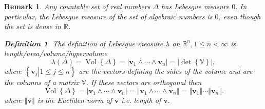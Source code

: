 \documentclass[aps,preprint]{revtex4}%
\newtheorem{definition}[theorem]{Definition}
\newtheorem{remark}[theorem]{Remark}
\begin{document}
\begin{remark}
Any \emph{countable }set of \emph{real} numbers $\Delta$ has \emph{Lebesgue}
measure $0.$ In particular, the Lebesgue measure of the set of algebraic
numbers is $0$, even though the set is dense in $\mathbb{R}$.

\begin{definition}
The definition of \emph{Lebesgue} measure $\lambda$ on $\mathbb{R}^{n},1\leq
n<\infty$ is \emph{length/area/volume/hypervolume}
\begin{equation}
\lambda\left(  \Delta\right)  =\operatorname*{Vol}\left\{  \Delta\right\}
=\left\vert \mathbf{v}_{1}\wedge\cdots\wedge\mathbf{v}_{n}\right\vert
=\left\vert \det\left\{  \mathbb{V}\right\}  \right\vert ,
\end{equation}
where $\left\{  \left.  \mathbf{v}_{j}\right\vert 1\leq j\leq n\right\}  $ are
the vectors defining the sides of the volume and are the columns of a matrix
$\mathbb{V}$. If these vectors are orthogonal then
\begin{equation}
\operatorname*{Vol}\left\{  \Delta\right\}  =\left\vert \mathbf{v}_{1}%
\wedge\cdots\wedge\mathbf{v}_{n}\right\vert =\left\Vert \mathbf{v}_{1}%
\wedge\cdots\wedge\mathbf{v}_{n}\right\Vert =\left\Vert \mathbf{v}%
_{1}\right\Vert \cdots\left\Vert \mathbf{v}_{n}\right\Vert .
\end{equation}
where $\left\Vert \mathbf{v}\right\Vert $ is the Eucliden norm of $\mathbf{v}$
i.e. length of $\mathbf{v.}$
\end{definition}
\end{remark}
\end{document}
